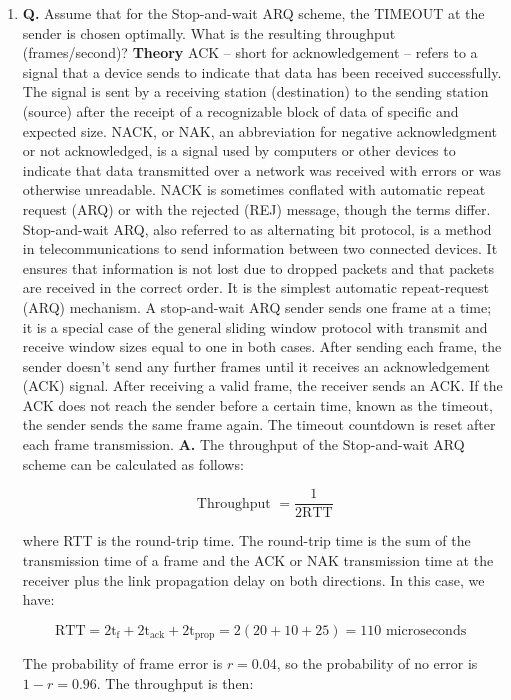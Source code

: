 \documentclass[main.tex]{subfiles}
\begin{document}
\begin{enumerate}
    \begin{enumerate}
        \item \textbf{Q.} Assume that for the Stop-and-wait ARQ scheme, the TIMEOUT at the sender is chosen optimally. What is the resulting throughput (frames/second)? \textbf{Theory} ACK -- short for acknowledgement -- refers to a signal that a device sends to indicate that data has been received successfully. The signal is sent by a receiving station (destination) to the sending station (source) after the receipt of a recognizable block of data of specific and expected size. NACK, or NAK, an abbreviation for negative acknowledgment or not acknowledged, is a signal used by computers or other devices to indicate that data transmitted over a network was received with errors or was otherwise unreadable. NACK is sometimes conflated with automatic repeat request (ARQ) or with the rejected (REJ) message, though the terms differ. Stop-and-wait ARQ, also referred to as alternating bit protocol, is a method in telecommunications to send information between two connected devices. It ensures that information is not lost due to dropped packets and that packets are received in the correct order. It is the simplest automatic repeat-request (ARQ) mechanism. A stop-and-wait ARQ sender sends one frame at a time; it is a special case of the general sliding window protocol with transmit and receive window sizes equal to one in both cases. After sending each frame, the sender doesn't send any further frames until it receives an acknowledgement (ACK) signal. After receiving a valid frame, the receiver sends an ACK. If the ACK does not reach the sender before a certain time, known as the timeout, the sender sends the same frame again. The timeout countdown is reset after each frame transmission. \textbf{A.} The throughput of the Stop-and-wait ARQ scheme can be calculated as follows:
        
        $$
        \text { Throughput }=\frac{1}{2 \mathrm{RTT}}
        $$
        
        where RTT is the round-trip time. The round-trip time is the sum of the transmission time of a frame and the ACK or NAK transmission time at the receiver plus the link propagation delay on both directions. In this case, we have:
        
        $$
        \mathrm{RTT}=2 \mathrm{t}_{\mathrm{f}}+2 \mathrm{t}_{\mathrm{ack}}+2 \mathrm{t}_{\mathrm{prop}}=2(20+10+25)=110 \text { microseconds }
        $$
        
        The probability of frame error is $r=0.04$, so the probability of no error is $1-r=0.96$. The throughput is then:
        

\end{enumerate}
\end{enumerate}
\end{document}
